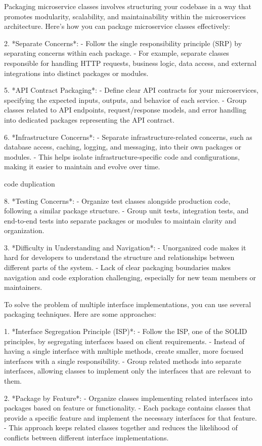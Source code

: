 Packaging microservice classes involves structuring your codebase in a way that promotes modularity, scalability, and maintainability within the microservices architecture. Here's how you can package microservice classes effectively:


2. *Separate Concerns*:
- Follow the single responsibility principle (SRP) by separating concerns within each package.
- For example, separate classes responsible for handling HTTP requests, business logic, data access, and external integrations into distinct packages or modules.


5. *API Contract Packaging*:
- Define clear API contracts for your microservices, specifying the expected inputs, outputs, and behavior of each service.
- Group classes related to API endpoints, request/response models, and error handling into dedicated packages representing the API contract.

6. *Infrastructure Concerns*:
- Separate infrastructure-related concerns, such as database access, caching, logging, and messaging, into their own packages or modules.
- This helps isolate infrastructure-specific code and configurations, making it easier to maintain and evolve over time.

code duplication


8. *Testing Concerns*:
- Organize test classes alongside production code, following a similar package structure.
- Group unit tests, integration tests, and end-to-end tests into separate packages or modules to maintain clarity and organization.

3. *Difficulty in Understanding and Navigation*:
- Unorganized code makes it hard for developers to understand the structure and relationships between different parts of the system.
- Lack of clear packaging boundaries makes navigation and code exploration challenging, especially for new team members or maintainers.


To solve the problem of multiple interface implementations, you can use several packaging techniques. Here are some approaches:

1. *Interface Segregation Principle (ISP)*:
- Follow the ISP, one of the SOLID principles, by segregating interfaces based on client requirements.
- Instead of having a single interface with multiple methods, create smaller, more focused interfaces with a single responsibility.
- Group related methods into separate interfaces, allowing classes to implement only the interfaces that are relevant to them.

2. *Package by Feature*:
- Organize classes implementing related interfaces into packages based on feature or functionality.
- Each package contains classes that provide a specific feature and implement the necessary interfaces for that feature.
- This approach keeps related classes together and reduces the likelihood of conflicts between different interface implementations.

